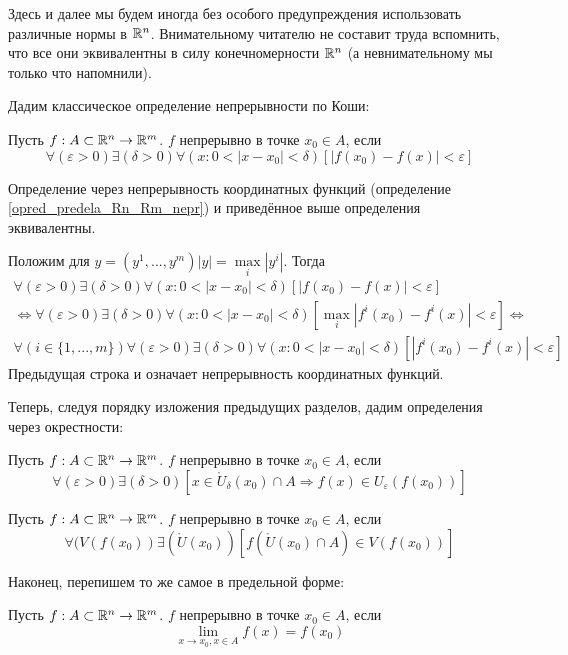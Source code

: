 Здесь и далее мы будем иногда без особого предупреждения использовать различные нормы в $\mathbb{R}^n$.
Внимательному читателю не составит труда вспомнить, что все они эквивалентны в силу конечномерности $\mathbb{R}^n$ (а невнимательному мы только что напомнили).

Дадим классическое определение непрерывности по Коши:
\begin{opr}
Пусть $f:A\subset\mathbb{R}^n\to\mathbb{R}^m$.
$f$ непрерывно в точке $x_0\in A$, если
$$
\forall(\varepsilon>0)\exists(\delta>0)\forall(x:0<|x-x_0|<\delta)[|f(x_0)-f(x)|<\varepsilon]
$$
\end{opr}

\begin{utverzhd}
Определение через непрерывность координатных функций (определение \ref{opred_predela_Rn_Rm_nepr}) и приведённое выше определения эквивалентны.
\end{utverzhd}

\dokvo
Положим для $y=(y^1, ... , y^m) |y|=\max\limits_{i}|y^i|$. 
Тогда
\begin{multline*}
\forall(\varepsilon>0)\exists(\delta>0)\forall(x:0<|x-x_0|<\delta)[|f(x_0)-f(x)|<\varepsilon]
\\\Leftrightarrow
\forall(\varepsilon>0)\exists(\delta>0)\forall(x:0<|x-x_0|<\delta)[\max\limits_{i}|f^i(x_0)-f^i(x)|<\varepsilon]
\Leftrightarrow\\
\forall(i\in\{1,...,m\})\forall(\varepsilon>0)\exists(\delta>0)\forall(x:0<|x-x_0|<\delta)[|f^i(x_0)-f^i(x)|<\varepsilon]
\end{multline*}
Предыдущая строка и означает непрерывность координатных функций.
\dokno

Теперь, следуя порядку изложения предыдущих разделов, дадим определения через окрестности:

\begin{opr}
Пусть $f:A\subset\mathbb{R}^n\to\mathbb{R}^m$.
$f$ непрерывно в точке $x_0\in A$, если
$$
\forall(\varepsilon>0)\exists(\delta>0)[x\in\mathring{U}_\delta(x_0)\cap A \Rightarrow f(x)\in U_\varepsilon(f(x_0))]
$$
\end{opr}

\begin{opr}
Пусть $f:A\subset\mathbb{R}^n\to\mathbb{R}^m$.
$f$ непрерывно в точке $x_0\in A$, если
$$
\forall(V(f(x_0))\exists(\mathring{U}(x_0))[f(\mathring{U}(x_0)\cap A)\in V(f(x_0))]
$$
\end{opr}

Наконец, перепишем то же самое в предельной форме:

\begin{opr}
Пусть $f:A\subset\mathbb{R}^n\to\mathbb{R}^m$.
$f$ непрерывно в точке $x_0\in A$, если
$$
\lim\limits_{x\to x_0, x\in A} f(x) = f(x_0)
$$
\end{opr}


